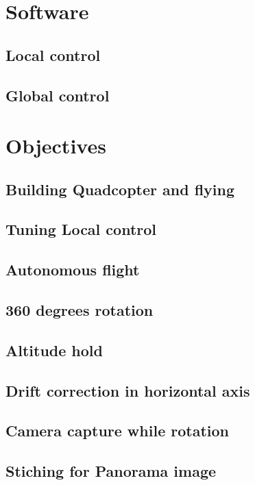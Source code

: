 \documentclass[11pt, a4paper, onecolumn, oneside, parskip=half]{scrartcl}
\begin{document}
\section{Software}
\subsection{Local control}

\subsection{Global control}


\section{Objectives}

\subsection{Building Quadcopter and flying}

\subsection{Tuning Local control}

\subsection{Autonomous flight}

\subsection{360 degrees rotation}

\subsection{Altitude hold}

\subsection{Drift correction in horizontal axis}

\subsection{Camera capture while rotation}

\subsection{Stiching for Panorama image}
\end{document}

